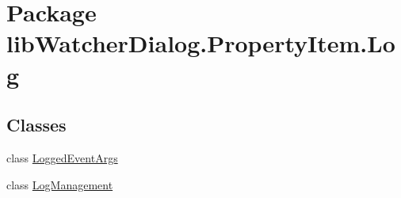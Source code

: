 \hypertarget{namespacelib_watcher_dialog_1_1_property_item_1_1_log}{\section{Package lib\+Watcher\+Dialog.\+Property\+Item.\+Log}
\label{namespacelib_watcher_dialog_1_1_property_item_1_1_log}
}
\subsection*{Classes}
\begin{DoxyCompactItemize}
\item 
class \hyperlink{classlib_watcher_dialog_1_1_property_item_1_1_log_1_1_logged_event_args}{Logged\+Event\+Args}
\item 
class \hyperlink{classlib_watcher_dialog_1_1_property_item_1_1_log_1_1_log_management}{Log\+Management}
\end{DoxyCompactItemize}
